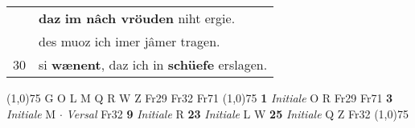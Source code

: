 \documentclass[8pt,a4paper,notitlepage]{article}
\begin{document}
\begin{table}[ht]
\begin{minipage}[t]{0.5\linewidth}
\begin{tabular}{rl}
 & \textbf{daz} \textbf{im nâch vröuden} niht ergie.\\ 
 & des muoz ich imer jâmer tragen.\\ 
30 & si \textbf{wænent}, daz ich in \textbf{schüefe} erslagen.\\ 
\end{tabular}
\scriptsize
\line(1,0){75} \newline
G O L M Q R W Z Fr29 Fr32 Fr71 \newline
\line(1,0){75} \newline
\textbf{1} \textit{Initiale} O R Fr29 Fr71  \textbf{3} \textit{Initiale} M   $\cdot$ \textit{Versal} Fr32  \textbf{9} \textit{Initiale} R  \textbf{23} \textit{Initiale} L W  \textbf{25} \textit{Initiale} Q Z Fr32  \newline
\line(1,0){75} \newline

\end{minipage}
\end{table}
\end{document}
